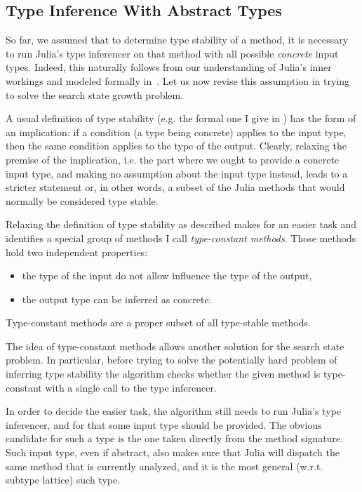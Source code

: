 \subsection{Type Inference With Abstract Types}%
\label{ssec:approx:space:abstract}

So far, we assumed that to determine type stability of a method, it is necessary
to run Julia's type inferencer on that method with all possible \emph{concrete} input
types. Indeed, this naturally follows from our understanding of Julia's inner
workings and modeled formally in~. Let us now revise this
assumption in trying to solve the search state growth problem.

A usual definition of type stability (e.g. the formal one I give in
) has the form of an implication: if a condition (a type
being concrete) applies to the input type, then the same condition applies to
the type of the output. Clearly, relaxing the premise of the implication, i.e.
the part where we ought to provide a concrete input type, and making no
assumption about the input type instead, leads to a stricter statement or, in
other words, a subset of the Julia methods that would normally be considered
type stable.

Relaxing the definition of type stability as described makes for an easier task
and identifies a special group of methods I call \emph{type-constant methods}.
Those methods hold two independent properties:
\begin{itemize}
  \item the type of the input do not allow influence the type of the output,
  \item the output type can be inferred as concrete.
\end{itemize}
Type-constant methods are a proper subset of all type-stable methods.

The idea of type-constant methods allows another solution for the search state
problem. In particular, before trying to solve the potentially hard problem of
inferring type stability the algorithm checks whether the given method is
type-constant with a single call to the type inferencer.


In order to decide the easier task, the algorithm still needs to run Julia's
type inferencer, and for that some input type should be provided. The obvious
candidate for such a type is the one taken directly from the method signature.
Such input type, even if abstract, also makes sure that Julia will dispatch the
same method that is currently analyzed, and it is the most general (w.r.t.
subtype lattice) such type.


